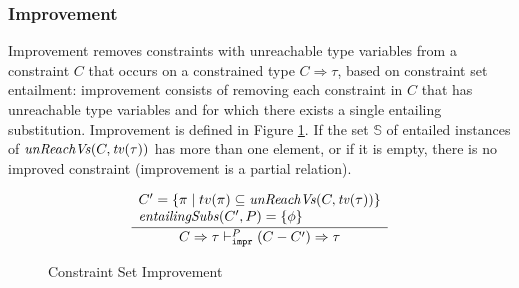 \subsubsection{Improvement}
\label{sec:improvement}

Improvement removes constraints with unreachable type variables from a
constraint $C$ that occurs on a constrained type $C\Rightarrow \tau$,
based on constraint set entailment: improvement consists of removing
each constraint in $C$ that has unreachable type variables and for
which there exists a single entailing substitution. Improvement is
defined in Figure \ref{fig:constraint-set-improvement}.
If the set $\mathbb{S}$ of entailed instances of
$\text{\it unReachVs\/}(C,{\it tv\/}(\tau))$ has more than one element, or if it is
empty, there is no improved constraint (improvement is a partial
relation).



\begin{figure}
   \[ \displaystyle
       \frac{
        \begin{array}{l}
           C' = \{ \pi \mid tv(\pi) \subseteq \text{\it unReachVs\/}(C, {\it tv\/}(\tau))\} \\
           \mathit{entailingSubs\/}(C', P) = \{ \phi \}
        \end{array} }
      {C \Rightarrow \tau \vdash_{\texttt{impr}}^{P} (C - C') \Rightarrow \tau}  \]
\caption{Constraint Set Improvement}
\label{fig:constraint-set-improvement}
\end{figure}

